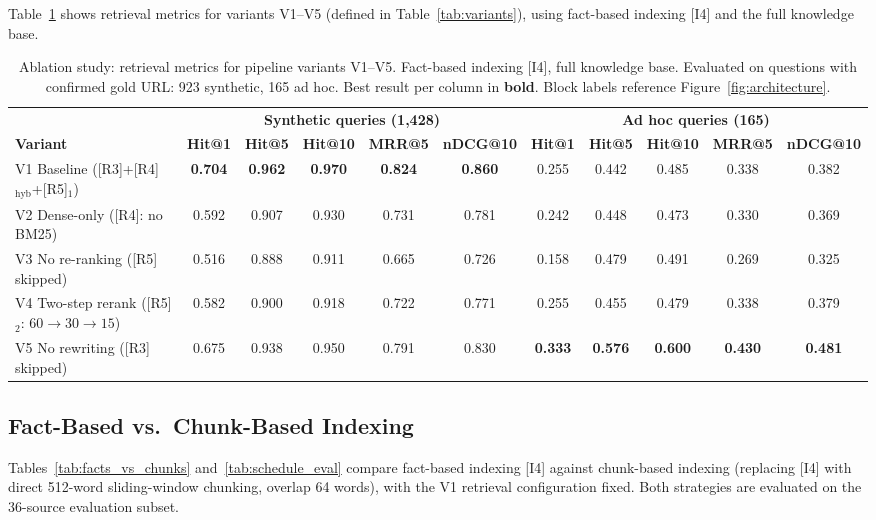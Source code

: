 \documentclass[sigconf,natbib=true]{acmart}
\begin{document}
Table~\ref{tab:ablation} shows retrieval metrics for variants V1--V5 (defined in Table~\ref{tab:variants}), using fact-based indexing [I4] and the full knowledge base.

\begin{table}[t]
\centering
\caption{Ablation study: retrieval metrics for pipeline variants V1--V5. Fact-based indexing [I4], full knowledge base. Evaluated on questions with confirmed gold URL: 923 synthetic, 165 ad hoc. Best result per column in \textbf{bold}. Block labels reference Figure~\ref{fig:architecture}.}
\label{tab:ablation}
\setlength{\tabcolsep}{3.5pt}
\small
\begin{tabular}{lcccccccccc}
\toprule
& \multicolumn{5}{c}{\textbf{Synthetic queries (1,428)}} & \multicolumn{5}{c}{\textbf{Ad hoc queries (165)}} \\
\cmidrule(lr){2-6}\cmidrule(lr){7-11}
\textbf{Variant} & \textbf{Hit@1} & \textbf{Hit@5} & \textbf{Hit@10} & \textbf{MRR@5} & \textbf{nDCG@10}
                 & \textbf{Hit@1} & \textbf{Hit@5} & \textbf{Hit@10} & \textbf{MRR@5} & \textbf{nDCG@10} \\
\midrule
V1 Baseline {\small ([R3]+[R4]$_\text{hyb}$+[R5]$_1$)}
  & \textbf{0.704} & \textbf{0.962} & \textbf{0.970} & \textbf{0.824} & \textbf{0.860}
  & 0.255 & 0.442 & 0.485 & 0.338 & 0.382 \\
V2 Dense-only {\small ([R4]: no BM25)}
  & 0.592 & 0.907 & 0.930 & 0.731 & 0.781
  & 0.242 & 0.448 & 0.473 & 0.330 & 0.369 \\
V3 No re-ranking {\small ([R5] skipped)}
  & 0.516 & 0.888 & 0.911 & 0.665 & 0.726
  & 0.158 & 0.479 & 0.491 & 0.269 & 0.325 \\
V4 Two-step rerank {\small ([R5]$_2$: $60\!\to\!30\!\to\!15$)}
  & 0.582 & 0.900 & 0.918 & 0.722 & 0.771
  & 0.255 & 0.455 & 0.479 & 0.338 & 0.379 \\
V5 No rewriting {\small ([R3] skipped)}
  & 0.675 & 0.938 & 0.950 & 0.791 & 0.830
  & \textbf{0.333} & \textbf{0.576} & \textbf{0.600} & \textbf{0.430} & \textbf{0.481} \\
\bottomrule
\end{tabular}
\end{table}

\subsection{Fact-Based vs.\ Chunk-Based Indexing}
\label{sec:facts_chunks}

Tables~\ref{tab:facts_vs_chunks} and~\ref{tab:schedule_eval} compare fact-based indexing [I4] against chunk-based indexing (replacing [I4] with direct 512-word sliding-window chunking, overlap 64 words), with the V1 retrieval configuration fixed.
Both strategies are evaluated on the 36-source evaluation subset.
\end{document}
